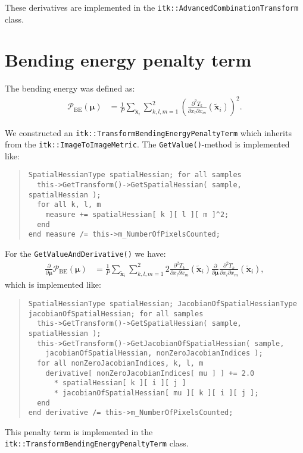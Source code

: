 \documentclass[]{article}
\newcommand{\vmu}{\bm{\mu}}
\newcommand{\vxt}[1][]{\bm{\widetilde x}_{#1}}
\newcommand{\D}[2]{\frac{\partial #1}{\partial #2}}
\newcommand{\Dd}[3]{\frac{\partial^2 #1}{\partial #2 \partial #3}}
\begin{document}
These derivatives are implemented in the
\texttt{itk::AdvancedCombinationTransform} class.

\section{Bending energy penalty term}

The bending energy was defined as:
\begin{align}
\mathcal{P}_{\mathrm{BE}}(\vmu) &= \frac{1}{P} \sum_{\vxt[i]}
\sum_{k,l,m = 1}^2 \left( \Dd{T_k}{x_l}{x_m}(\vxt[i]) \right)^2.
\end{align}

We constructed an \texttt{itk::TransformBendingEnergyPenaltyTerm}
which inherits from the \texttt{itk::ImageToImage\-Metric}. The
\texttt{GetValue()}-method is implemented like:
\begin{quote}
\begin{verbatim}
SpatialHessianType spatialHessian; for all samples
  this->GetTransform()->GetSpatialHessian( sample, spatialHessian );
  for all k, l, m
    measure += spatialHessian[ k ][ l ][ m ]^2;
  end
end measure /= this->m_NumberOfPixelsCounted;
\end{verbatim}
\end{quote}

For the \texttt{GetValueAndDerivative()} we have:
\begin{align}
\D{}{\vmu} \mathcal{P}_{\mathrm{BE}}(\vmu) &=  \frac{1}{P}
\sum_{\vxt[i]} \sum_{k,l,m = 1}^2 2 \Dd{T_k}{x_l}{x_m} (\vxt[i])
\D{}{\vmu} \Dd{T_k}{x_l}{x_m}(\vxt[i]),
\end{align}
which is implemented like:
\begin{quote}
\begin{verbatim}
SpatialHessianType spatialHessian; JacobianOfSpatialHessianType
jacobianOfSpatialHessian; for all samples
  this->GetTransform()->GetSpatialHessian( sample, spatialHessian );
  this->GetTransform()->GetJacobianOfSpatialHessian( sample,
    jacobianOfSpatialHessian, nonZeroJacobianIndices );
  for all nonZeroJacobianIndices, k, l, m
    derivative[ nonZeroJacobianIndices[ mu ] ] += 2.0
      * spatialHessian[ k ][ i ][ j ]
      * jacobianOfSpatialHessian[ mu ][ k ][ i ][ j ];
  end
end derivative /= this->m_NumberOfPixelsCounted;
\end{verbatim}
\end{quote}

This penalty term is implemented in the
\texttt{itk::TransformBendingEnergyPenaltyTerm} class.
\end{document}
